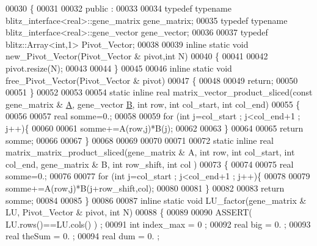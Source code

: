 \begin{DoxyCode}
00030 \{
00031 
00032 public :
00033 
00034   \textcolor{keyword}{typedef} \textcolor{keyword}{typename} blitz\_interface<real>::gene\_matrix gene\_matrix;
00035   \textcolor{keyword}{typedef} \textcolor{keyword}{typename} blitz\_interface<real>::gene\_vector gene\_vector;
00036 
00037   \textcolor{keyword}{typedef} blitz::Array<int,1> Pivot\_Vector;
00038 
00039   \textcolor{keyword}{inline} \textcolor{keyword}{static} \textcolor{keywordtype}{void} new\_Pivot\_Vector(Pivot\_Vector & pivot,\textcolor{keywordtype}{int} N)
00040   \{
00041 
00042     pivot.resize(N);
00043 
00044   \}
00045 
00046   \textcolor{keyword}{inline} \textcolor{keyword}{static} \textcolor{keywordtype}{void} free\_Pivot\_Vector(Pivot\_Vector & pivot)
00047   \{
00048     
00049     \textcolor{keywordflow}{return};
00050 
00051   \}
00052 
00053 
00054   \textcolor{keyword}{static} \textcolor{keyword}{inline} real matrix\_vector\_product\_sliced(\textcolor{keyword}{const} gene\_matrix & \hyperlink{group___core___module_class_eigen_1_1_matrix}{A}, gene\_vector 
      \hyperlink{group___core___module_class_eigen_1_1_matrix}{B}, \textcolor{keywordtype}{int} row, \textcolor{keywordtype}{int} col\_start, \textcolor{keywordtype}{int} col\_end)
00055   \{
00056     
00057     real somme=0.;
00058     
00059     \textcolor{keywordflow}{for} (\textcolor{keywordtype}{int} j=col\_start ; j<col\_end+1 ; j++)\{
00060     
00061     somme+=A(row,j)*B(j);
00062     
00063     \}
00064 
00065     \textcolor{keywordflow}{return} somme;
00066 
00067   \}
00068 
00069 
00070 
00071 
00072   \textcolor{keyword}{static} \textcolor{keyword}{inline} real matrix\_matrix\_product\_sliced(gene\_matrix & A, \textcolor{keywordtype}{int} row, \textcolor{keywordtype}{int} col\_start, \textcolor{keywordtype}{int} col\_end, 
      gene\_matrix & B, \textcolor{keywordtype}{int} row\_shift, \textcolor{keywordtype}{int} col )
00073   \{
00074     
00075     real somme=0.;
00076     
00077     \textcolor{keywordflow}{for} (\textcolor{keywordtype}{int} j=col\_start ; j<col\_end+1 ; j++)\{
00078     
00079     somme+=A(row,j)*B(j+row\_shift,col);
00080     
00081     \}
00082 
00083     \textcolor{keywordflow}{return} somme;
00084 
00085   \}
00086 
00087   \textcolor{keyword}{inline} \textcolor{keyword}{static} \textcolor{keywordtype}{void} LU\_factor(gene\_matrix & LU, Pivot\_Vector & pivot, \textcolor{keywordtype}{int} N)
00088   \{
00089 
00090     ASSERT( LU.rows()==LU.cols() ) ;
00091     \textcolor{keywordtype}{int} index\_max = 0 ;
00092     real big = 0. ;
00093     real theSum = 0. ;
00094     real dum = 0. ;

\end{DoxyCode}

